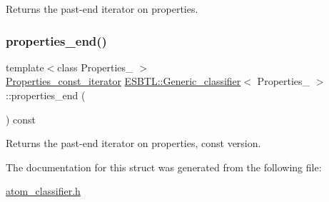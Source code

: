 Returns the past-\/end iterator on properties. \mbox{\label{structESBTL_1_1Generic__classifier_a384420a9e0c6c96e2091fbfd825c4c6a}} 
\subsubsection{\texorpdfstring{properties\+\_\+end()}{properties\_end()}\hspace{0.1cm}{\footnotesize\ttfamily [2/2]}}
{\footnotesize\ttfamily template$<$class Properties\+\_\+ $>$ \\
\hyperlink{structESBTL_1_1Generic__classifier_aa2bfed4b529df9cbc252bacf20a15174}{Properties\+\_\+const\+\_\+iterator} \hyperlink{structESBTL_1_1Generic__classifier}{E\+S\+B\+T\+L\+::\+Generic\+\_\+classifier}$<$ Properties\+\_\+ $>$\+::properties\+\_\+end (\begin{DoxyParamCaption}{ }\end{DoxyParamCaption}) const\hspace{0.3cm}{\ttfamily [inline]}}

Returns the past-\/end iterator on properties, const version. 

The documentation for this struct was generated from the following file\+:\begin{DoxyCompactItemize}
\item 
\hyperlink{atom__classifier_8h}{atom\+\_\+classifier.\+h}\end{DoxyCompactItemize}
